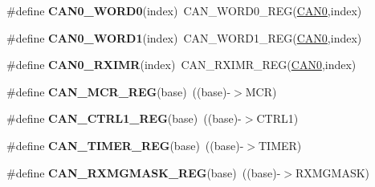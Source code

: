 \begin{DoxyCompactItemize}
\item 
\#define {\bfseries C\+A\+N0\+\_\+\+W\+O\+R\+D0}(index)~C\+A\+N\+\_\+\+W\+O\+R\+D0\+\_\+\+R\+EG(\hyperlink{group__CAN__Peripheral__Access__Layer_ga8882ee5d18ec64b8193396ec6bc66fe5}{C\+A\+N0},index)\hypertarget{group__CAN__Register__Accessor__Macros_gabf04bc963948f24928e990ebb683fd15}{}\label{group__CAN__Register__Accessor__Macros_gabf04bc963948f24928e990ebb683fd15}

\item 
\#define {\bfseries C\+A\+N0\+\_\+\+W\+O\+R\+D1}(index)~C\+A\+N\+\_\+\+W\+O\+R\+D1\+\_\+\+R\+EG(\hyperlink{group__CAN__Peripheral__Access__Layer_ga8882ee5d18ec64b8193396ec6bc66fe5}{C\+A\+N0},index)\hypertarget{group__CAN__Register__Accessor__Macros_ga0a1269cd4f0ca08584208ed1988ee733}{}\label{group__CAN__Register__Accessor__Macros_ga0a1269cd4f0ca08584208ed1988ee733}

\item 
\#define {\bfseries C\+A\+N0\+\_\+\+R\+X\+I\+MR}(index)~C\+A\+N\+\_\+\+R\+X\+I\+M\+R\+\_\+\+R\+EG(\hyperlink{group__CAN__Peripheral__Access__Layer_ga8882ee5d18ec64b8193396ec6bc66fe5}{C\+A\+N0},index)\hypertarget{group__CAN__Register__Accessor__Macros_gae42ef907bb078d24fcbc14fa1be37105}{}\label{group__CAN__Register__Accessor__Macros_gae42ef907bb078d24fcbc14fa1be37105}

\item 
\#define {\bfseries C\+A\+N\+\_\+\+M\+C\+R\+\_\+\+R\+EG}(base)~((base)-\/$>$M\+CR)\hypertarget{group__CAN__Register__Accessor__Macros_gab0b9a78c6ecb2569759f2df7d48247d3}{}\label{group__CAN__Register__Accessor__Macros_gab0b9a78c6ecb2569759f2df7d48247d3}

\item 
\#define {\bfseries C\+A\+N\+\_\+\+C\+T\+R\+L1\+\_\+\+R\+EG}(base)~((base)-\/$>$C\+T\+R\+L1)\hypertarget{group__CAN__Register__Accessor__Macros_ga6858d91c132de14237f524f789306a76}{}\label{group__CAN__Register__Accessor__Macros_ga6858d91c132de14237f524f789306a76}

\item 
\#define {\bfseries C\+A\+N\+\_\+\+T\+I\+M\+E\+R\+\_\+\+R\+EG}(base)~((base)-\/$>$T\+I\+M\+ER)\hypertarget{group__CAN__Register__Accessor__Macros_gafca172705bd196e432969646873ada6a}{}\label{group__CAN__Register__Accessor__Macros_gafca172705bd196e432969646873ada6a}

\item 
\#define {\bfseries C\+A\+N\+\_\+\+R\+X\+M\+G\+M\+A\+S\+K\+\_\+\+R\+EG}(base)~((base)-\/$>$R\+X\+M\+G\+M\+A\+SK)\hypertarget{group__CAN__Register__Accessor__Macros_gaa179231475edb9f872312473a9300f03}{}\label{group__CAN__Register__Accessor__Macros_gaa179231475edb9f872312473a9300f03}


\end{DoxyCompactItemize}
